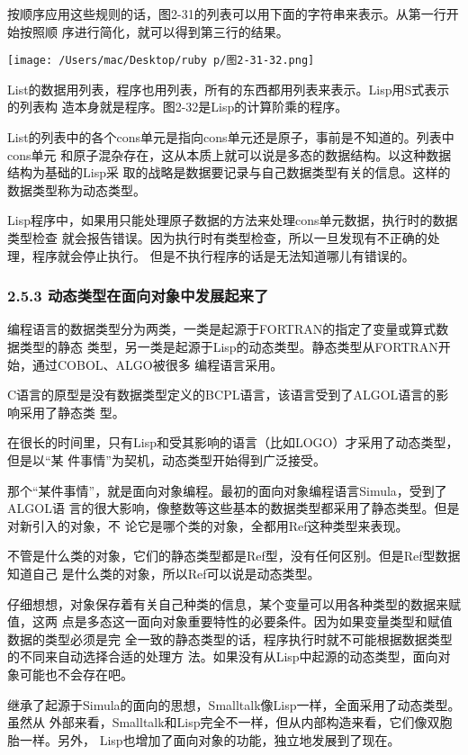 \documentclass[11pt]{ctexart}
\begin{document}
按顺序应用这些规则的话，图2-31的列表可以用下面的字符串来表示。从第一行开始按照顺
序进行简化，就可以得到第三行的结果。

\begin{center}
\texttt{[image: /Users/mac/Desktop/ruby p/图2-31-32.png]}
\end{center}

List的数据用列表，程序也用列表，所有的东西都用列表来表示。Lisp用S式表示的列表构
造本身就是程序。图2-32是Lisp的计算阶乘的程序。

List的列表中的各个cons单元是指向cons单元还是原子，事前是不知道的。列表中cons单元
和原子混杂存在，这从本质上就可以说是多态的数据结构。以这种数据结构为基础的Lisp采
取的战略是数据要记录与自己数据类型有关的信息。这样的数据类型称为动态类型。

Lisp程序中，如果用只能处理原子数据的方法来处理cons单元数据，执行时的数据类型检查
就会报告错误。因为执行时有类型检查，所以一旦发现有不正确的处理，程序就会停止执行。
但是不执行程序的话是无法知道哪儿有错误的。
\subsubsection{2.5.3 动态类型在面向对象中发展起来了}
\label{sec:orgfe29848}

编程语言的数据类型分为两类，一类是起源于FORTRAN的指定了变量或算式数据类型的静态
类型，另一类是起源于Lisp的动态类型。静态类型从FORTRAN开始，通过COBOL、ALGO被很多
编程语言采用。

C语言的原型是没有数据类型定义的BCPL语言，该语言受到了ALGOL语言的影响采用了静态类
型。

在很长的时间里，只有Lisp和受其影响的语言（比如LOGO）才采用了动态类型，但是以“某
件事情”为契机，动态类型开始得到广泛接受。

那个“某件事情”，就是面向对象编程。最初的面向对象编程语言Simula，受到了ALGOL语
言的很大影响，像整数等这些基本的数据类型都采用了静态类型。但是对新引入的对象，不
论它是哪个类的对象，全都用Ref这种类型来表现。

不管是什么类的对象，它们的静态类型都是Ref型，没有任何区别。但是Ref型数据知道自己
是什么类的对象，所以Ref可以说是动态类型。

仔细想想，对象保存着有关自己种类的信息，某个变量可以用各种类型的数据来赋值，这两
点是多态这一面向对象重要特性的必要条件。因为如果变量类型和赋值数据的类型必须是完
全一致的静态类型的话，程序执行时就不可能根据数据类型的不同来自动选择合适的处理方
法。如果没有从Lisp中起源的动态类型，面向对象可能也不会存在吧。

继承了起源于Simula的面向的思想，Smalltalk像Lisp一样，全面采用了动态类型。虽然从
外部来看，Smalltalk和Lisp完全不一样，但从内部构造来看，它们像双胞胎一样。另外，
Lisp也增加了面向对象的功能，独立地发展到了现在。
\end{document}
